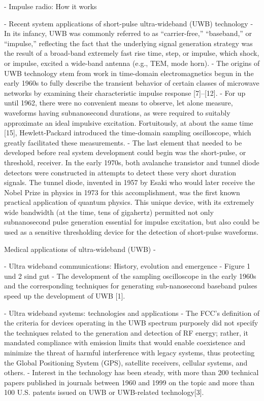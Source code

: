 \cite{win1998impulse}
	- Impulse radio: How it works
	
\cite{fontana2004recent}
	- Recent system applications of short-pulse ultra-wideband (UWB) technology	
	- In its infancy, UWB was commonly referred to as “carrier-free,” “baseband,” or “impulse,” reflecting the fact that the underlying signal generation strategy was the result of a broad-band extremely fast rise time, step, or impulse, which shock, or impulse, excited a wide-band antenna (e.g., TEM, mode horn).
	- The origins of UWB technology stem from work in time-domain electromagnetics begun in the early 1960s to fully describe the transient behavior of certain classes of microwave networks by examining their characteristic impulse response [7]–[12].
	- For up until 1962, there were no convenient means to observe, let alone measure, waveforms having subnanosecond durations, as were required to suitably approximate an ideal impulsive excitation. Fortuitously, at about the same time [15], Hewlett-Packard introduced the time-domain sampling oscilloscope, which greatly facilitated these measurements.
	- The last element that needed to be developed before real system development could begin was the short-pulse, or threshold, receiver. In the early 1970s, both avalanche transistor and tunnel diode detectors were constructed in attempts to detect these very short duration signals. The tunnel diode, invented in 1957 by Esaki who would later receive the Nobel Prize in physics in 1973 for this accomplishment, was the first known practical application of quantum physics. This unique device, with its extremely wide bandwidth (at the time, tens of gigahertz) permitted not only subnanosecond pulse generation essential for impulse excitation, but also could be used as a sensitive thresholding device for the detection of short-pulse waveforms.
	
Medical applications of ultra-wideband (UWB)
	- \cite{pan2007medical}
	
\cite{lakkundi2006ultra}
	- Ultra wideband communications: History, evolution and emergence
	- Figure 1 und 2 sind gut
	- The development of the sampling oscilloscope in the early 1960s and the corresponding techniques for generating sub-nanosecond baseband pulses speed up the development of UWB [1].
	
\cite{aiello2006ultra}
	- Ultra wideband systems: technologies and applications
	- The FCC's definition of the criteria for devices operating in the UWB spectrum purposely did not specify the techniques related to the generation and detection of RF energy; rather, it mandated compliance with emission limits that would enable coexistence and minimize the threat of harmful interference with legacy systems, thus protecting the Global Positioning System (GPS), satellite receivers, cellular systems, and others.
	- Interest in the technology has been steady, with more than 200 technical papers published in journals between 1960 and 1999 on the topic and more than 100 U.S. patents issued on UWB or UWB-related technology[3].


